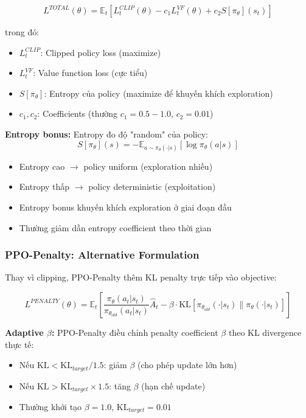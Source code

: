 \begin{equation}
L^{TOTAL}(\theta) = \mathbb{E}_t \left[ L^{CLIP}_t(\theta) - c_1 L^{VF}_t(\theta) + c_2 S[\pi_\theta](s_t) \right]
\end{equation}

trong đó:
\begin{itemize}
\item $L^{CLIP}_t$: Clipped policy loss (maximize)
\item $L^{VF}_t$: Value function loss (cực tiểu)
\item $S[\pi_\theta]$: Entropy của policy (maximize để khuyến khích exploration)
\item $c_1, c_2$: Coefficients (thường $c_1 = 0.5-1.0$, $c_2 = 0.01$)
\end{itemize}

\textbf{Entropy bonus:} Entropy đo độ "random" của policy:
\begin{equation}
S[\pi_\theta](s) = -\mathbb{E}_{a \sim \pi_\theta(\cdot|s)} [ \log \pi_\theta(a|s) ]
\end{equation}

\begin{itemize}
\item Entropy cao $\rightarrow$ policy uniform (exploration nhiều)
\item Entropy thấp $\rightarrow$ policy deterministic (exploitation)
\item Entropy bonus khuyến khích exploration ở giai đoạn đầu
\item Thường giảm dần entropy coefficient theo thời gian
\end{itemize}

\subsubsection{PPO-Penalty: Alternative Formulation}

Thay vì clipping, PPO-Penalty thêm KL penalty trực tiếp vào objective:

\begin{equation}
L^{PENALTY}(\theta) = \mathbb{E}_t \left[ \frac{\pi_\theta(a_t|s_t)}{\pi_{\theta_{old}}(a_t|s_t)} \hat{A}_t - \beta \cdot \text{KL}[\pi_{\theta_{old}}(\cdot|s_t) \| \pi_\theta(\cdot|s_t)] \right]
\end{equation}

\textbf{Adaptive $\beta$:} PPO-Penalty điều chỉnh penalty coefficient $\beta$ theo KL divergence thực tế:
\begin{itemize}
\item Nếu $\text{KL} < \text{KL}_{target} / 1.5$: giảm $\beta$ (cho phép update lớn hơn)
\item Nếu $\text{KL} > \text{KL}_{target} \times 1.5$: tăng $\beta$ (hạn chế update)
\item Thường khởi tạo $\beta = 1.0$, $\text{KL}_{target} = 0.01$
\end{itemize}


